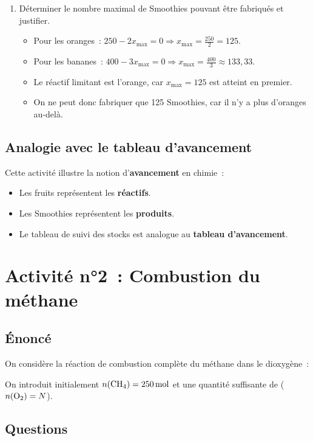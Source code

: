 \documentclass[10pt,a4paper]{article}
\newcommand{\correction}[1]{\textcolor{correction}{#1}}
\begin{document}
\begin{enumerate}
    \item Déterminer le nombre maximal de Smoothies pouvant être fabriqués et justifier.
    \correction{
        \begin{itemize}
            \item Pour les oranges~: $250 - 2x_{\text{max}} = 0 \Rightarrow x_{\text{max}} = \frac{250}{2} = 125$.
            \item Pour les bananes~: $400 - 3x_{\text{max}} = 0 \Rightarrow x_{\text{max}} = \frac{400}{3} \approx 133,33$.
            \item Le réactif limitant est l'orange, car $x_{\text{max}} = 125$ est atteint en premier.
            \item On ne peut donc fabriquer que 125 Smoothies, car il n'y a plus d'oranges au-delà.
        \end{itemize}
    }
\end{enumerate}

\subsection*{Analogie avec le tableau d'avancement}
Cette activité illustre la notion d'\textbf{avancement} en chimie~:
\begin{itemize}
    \item Les fruits représentent les \textbf{réactifs}.
    \item Les Smoothies représentent les \textbf{produits}.
    \item Le tableau de suivi des stocks est analogue au \textbf{tableau d'avancement}.
\end{itemize}


\section*{Activité n°2~: Combustion du méthane}

\subsection*{Énoncé}
On considère la réaction de combustion complète du méthane dans le dioxygène~:\\

On introduit initialement $n(\ce{CH4}) = \SI{250}{\mole}$ et une quantité suffisante de  ($n(\ce{O2}) = N$).

\subsection*{Questions}
\end{document}

